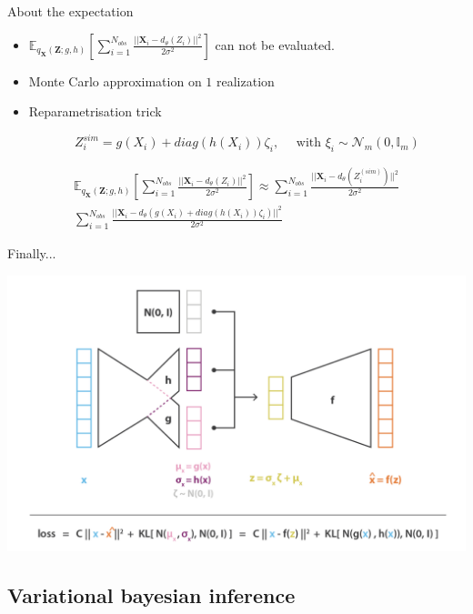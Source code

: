 \documentclass[compress,10pt]{beamer}
\begin{document}
\begin{frame}{About the expectation}
\begin{itemize}
 \item \(\mathbb{E}_{q_{\mathbf{X}}(\mathbf{Z};g,h)} \left[\sum_{i=1}^{N_{obs}}  \frac{||\mathbf{X}_i - d_{\theta}(Z_i)||^2}{2\sigma^2}\right]\)
can not be evaluated.


\item Monte Carlo approximation on $1$ realization
\item Reparametrisation trick 

$$Z_i^{sim} = g(X_i) + diag(h(X_i))\zeta_i, \quad \mbox{ with } \xi_i\sim \mathcal{N}_m(0,\mathbb{I}_m)$$
\end{itemize}


\begin{eqnarray*}
 \mathbb{E}_{q_{\mathbf{X}}(\mathbf{Z};g,h)}  \left[\sum_{i=1}^{N_{obs}}   \frac{||\mathbf{X}_i - d_{\theta}(Z_i)||^2}{2\sigma^2}\right] \approx  \sum_{i=1}^{N_{obs}} \frac{||\mathbf{X}_i - d_{\theta}(Z^{(sim)}_i)||^2}{2\sigma^2}\\
  \sum_{i=1}^{N_{obs}} \frac{||\mathbf{X}_i - d_{\theta}(g(X_i) + diag(h(X_i))\zeta_i)||^2}{2\sigma^2}
\end{eqnarray*}



\end{frame}
\begin{frame}{Finally...}
\begin{center}\includegraphics[width=0.8\linewidth]{images/varAutoencoderAll} \end{center}
 
\end{frame}


\subsection{Variational bayesian inference}
\end{document}
